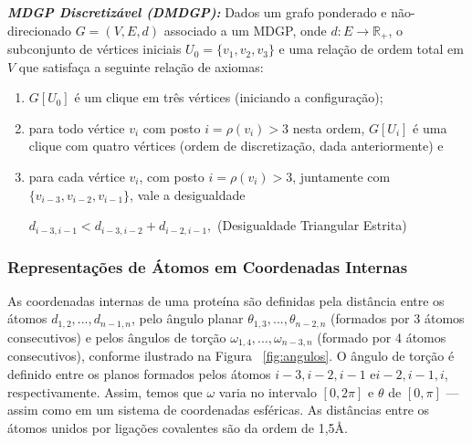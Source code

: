 \begin{center}
	\begin{minipage}{0.9 \linewidth}
		\textbf{\textit{MDGP Discretizável (DMDGP):}} Dados um grafo ponderado e não-direcionado $G = (V,E,d)$ associado a um MDGP, onde $d: E \longrightarrow \mathbb{R}_{+}$, o subconjunto de vértices iniciais $U_{0} = \{v_{1},v_{2},v_{3} \}$ e uma relação de ordem total em $V$ que satisfaça a seguinte relação de axiomas:
		\begin{enumerate}
			\vspace{-0.2cm}
			\item $G[U_{0}]$ é um clique em três vértices (iniciando a configuração);
			\vspace{-0.2cm}
			\item para todo vértice $v_{i}$ com posto $i = \rho(v_{i}) > 3$ nesta ordem, $G[U_{i}]$ é uma clique com quatro vértices (ordem de discretização, dada anteriormente) e
			\vspace{-0.2cm}
			\item para cada vértice $v_{i}$, com posto $i = \rho(v_{i}) > 3$, juntamente com $\{ v_{i-3}, v_{i-2} , v_{i-1} \}$, vale a desigualdade
			\vspace{-0.25cm}
			\begin{center}
				$d_{i-3,i-1} < d_{i-3,i-2} + d_{i-2,i-1},$ \hspace{0.5cm} (Desigualdade Triangular Estrita)
			\end{center}
		\end{enumerate}
		\vspace{-0.2cm}
	\end{minipage}
\end{center}


\subsubsection{Representações de Átomos em Coordenadas Internas\label{sec:bi}}
As coordenadas internas de uma proteína são definidas pela distância entre os átomos $d_{1,2}, ..., d_{n - 1,n}$, pelo ângulo planar $\theta_{1,3}, ...,\theta_{n - 2,n}$ (formados por 3 átomos consecutivos) e pelos ângulos de torção $\omega_{1,4}, ..., \omega_{n-3,n}$ (formado por 4 átomos consecutivos), conforme ilustrado na Figura ~\ref{fig:angulos}. O ângulo de torção é definido entre os planos formados pelos átomos $i-3,i-2,i-1$ e$i-2,i-1,i$, respectivamente. Assim, temos que $\omega$ varia no intervalo $[0,2\pi]$ e $\theta$ de $[0,\pi]$ --- assim como em um sistema de coordenadas esféricas. As distâncias entre os átomos unidos por ligações covalentes são da ordem de 1,5\AA. 

